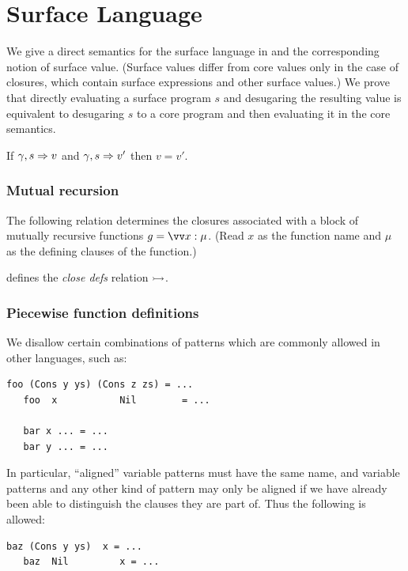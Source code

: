 \section{Surface Language}

We give a direct semantics for the surface language in  and the corresponding notion of
surface value. (Surface values differ from core values only in the case of closures, which contain surface
expressions and other surface values.) We prove that directly evaluating a surface program $s$ and desugaring
the resulting value is equivalent to desugaring $s$ to a core program and then evaluating it in the core
semantics.

\begin{lemma}[Determinism]
   \label{lem:surface:eval:determinism}
   If $\gamma, s \Rightarrow v$ and $\gamma, s \Rightarrow v'$ then $v = v'$.
\end{lemma}

\subsubsection{Mutual recursion}

The following relation determines the closures associated with a block of mutually recursive functions $g =
\seq{\bind{x}{\mu}}$. (Read $x$ as the function name and $\mu$ as the defining clauses of the function.)

\begin{definition}
   \label{def:surface:close-defs}
    defines the \emph{close defs} relation $\rightarrowtail$.
\end{definition}

\subsubsection{Piecewise function definitions}

We disallow certain combinations of patterns which are commonly allowed in other languages, such as:%
{\small
\begin{lstlisting}[language=Fluid]
   foo (Cons y ys) (Cons z zs) = ...
   foo  x           Nil        = ...

   bar x ... = ...
   bar y ... = ...
\end{lstlisting}}

\noindent In particular, ``aligned'' variable patterns must have the same name, and variable patterns and any other kind of pattern may only be aligned if we have already been able to distinguish the clauses they are part of. Thus the following is allowed:%
{\small
\begin{lstlisting}[language = Fluid]
   baz (Cons y ys)  x = ...
   baz  Nil         x = ...
\end{lstlisting}}

